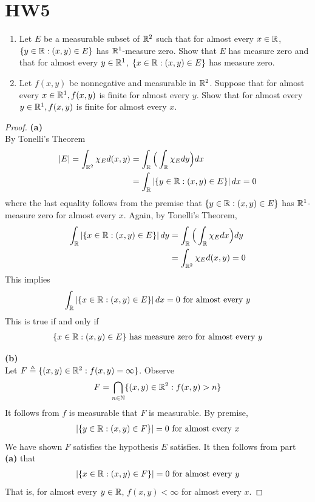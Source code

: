 \documentclass{report}
\begin{document}
\section{HW5}
\begin{question}{}{}
\begin{enumerate}[label=(\alph*)]
  \item Let $E$ be a measurable subset of $\mathbb{R}^2$ such that for almost every  $x\in\mathbb{R}$, $\{ y\in\mathbb{R} : (x,y)\in E \}$ has $\mathbb{R}^1$-measure zero. Show that  $E$ has measure zero and that for almost every  $y\in\mathbb{R}^1$, $\{ x\in\mathbb{R}:(x,y)\in E \}$ has measure zero.  
  \item Let $f(x,y)$ be nonnegative and measurable in $\mathbb{R}^2$. Suppose that for almost every  $x\in\mathbb{R}^1,f(x,y)$ is finite for almost every $y$.  Show that for almost every $y\in\mathbb{R}^1,f(x,y)$ is finite for almost every $x$. 
\end{enumerate}
\end{question}
\begin{proof}
\textbf{(a)}\\

By Tonelli's Theorem 
\begin{align*}
\left|E\right|=\int_{\mathbb{R}^2}\chi_E d(x,y)&=\int_{\mathbb{R}} \Big(\int_{\mathbb{R}} \chi_E dy\Big)dx\\
&=\int_{\mathbb{R}} \left|\{ y\in\mathbb{R}:(x,y)\in E \}\right| dx=0
\end{align*}
where the last equality follows from the premise that $\{ y\in\mathbb{R}: (x,y)\in E \}$ has $\mathbb{R}^1$-measure zero for almost every  $x$. Again, by Tonelli's Theorem, 
\begin{align*}
\int_{\mathbb{R}} \left|\{ x\in\mathbb{R}: (x,y)\in E \}\right| dy&=\int_{\mathbb{R}} \Big(\int_{\mathbb{R}} \chi_E dx\Big)dy\\
&=\int_{\mathbb{R}^2}\chi_E d(x,y)=0
\end{align*}
This implies 
\begin{align*}
\int_{\mathbb{R}} \left|\{ x\in\mathbb{R}: (x,y)\in E \}\right|dx=0\text{ for almost every }y
\end{align*}
This is true if and only if  
\begin{align*}
\{ x\in\mathbb{R}: (x,y) \in E \}\text{ has measure zero for almost every }y
\end{align*}

\textbf{(b)} \\

Let $F\triangleq \{ (x,y)\in\mathbb{R}^2: f(x,y)=\infty \}$. Observe 
\begin{align*}
F= \bigcap_{n\in\mathbb{N}} \{ (x,y)\in\mathbb{R}^2:f(x,y)>n \}
\end{align*}
It follows from $f$ is measurable that $F$ is  measurable. By premise, 
\begin{align*}
\left|\{ y\in\mathbb{R}: (x,y)\in F \}\right|=0\text{ for almost every }x 
\end{align*}
We have shown $F$ satisfies the hypothesis $E$ satisfies. It then follows from part \textbf{(a)} that 
\begin{align*}
  \left|\{ x\in\mathbb{R}: (x,y)\in F \}\right|=0\text{ for almost every }y
\end{align*}
That is, for almost every $y\in\mathbb{R}$, $f(x,y)<\infty$ for almost every $x$. 
\end{proof}
\end{document}
